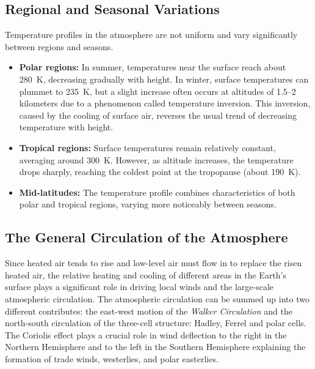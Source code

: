 \subsection*{Regional and Seasonal Variations}

Temperature profiles in the atmosphere are not uniform and vary significantly between regions and seasons. 

\begin{itemize}
    \item \textbf{Polar regions:} In summer, temperatures near the surface reach about 280~K, decreasing gradually with height. In winter, surface temperatures can plummet to 235~K, but a slight increase often occurs at altitudes of 1.5--2 kilometers due to a phenomenon called temperature inversion. This inversion, caused by the cooling of surface air, reverses the usual trend of decreasing temperature with height.
    \item \textbf{Tropical regions:} Surface temperatures remain relatively constant, averaging around 300~K. However, as altitude increases, the temperature drops sharply, reaching the coldest point at the tropopause (about 190~K).
    \item \textbf{Mid-latitudes:} The temperature profile combines characteristics of both polar and tropical regions, varying more noticeably between seasons.
\end{itemize}
\subsection{The General Circulation of the Atmosphere}\label{chp:GeneralCirculation}

Since heated air tends to rise and low-level air must flow in to replace the risen heated air, the relative heating and cooling of different areas in the Earth’s surface plays a significant role in driving local winds and the large-scale atmospheric circulation. 
The atmospheric circulation can be summed up into two different contributes: the east-west motion of the \textit{Walker Circulation} and the north-south circulation of the 
three-cell structure: Hadley, Ferrel and polar cells. The Coriolis effect plays a crucial role in wind deflection to the right in the Northern Hemisphere and to the left in the Southern Hemisphere explaining the formation of trade winds, westerlies, and polar easterlies.

